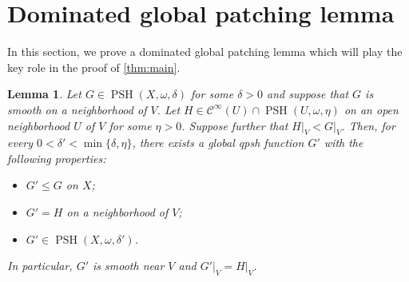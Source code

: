 \documentclass[12pt,reqno]{amsart}
\newtheorem{lem}{Lemma}[section]
\newtheorem{rem}{Remark}[section]
\newcommand{\PSH}{\operatorname{PSH}}
\newcommand{\restr}[2]{\left.#1\right|_{#2}}
\begin{document}
	
	\section{Dominated global patching lemma}
	
	In this section, we prove a dominated global patching lemma which will play the key role in the proof of \cref{thm:main}.
	
	\begin{lem}\label{lem:insertion}
		Let $G\in\PSH(X,\omega,\delta)$ for some $\delta>0$ and suppose that $G$ is smooth on a neighborhood of $V$. Let $H\in \mathcal C^\infty(U)\cap\PSH(U,\omega,\eta)$ on an open neighborhood $U$ of $V$ for some $\eta>0$. Suppose further that  $\restr{H}{V}<\restr{G}{V}$.
		Then, for every $0<\delta'<\min\{\delta,\eta\}$,
		there exists a global qpsh function $G'$ with the following properties:
		\begin{itemize}
			\item  $G'\leq G$ on $X$;
			\item $G'=H$ on a neighborhood of $V$;
			\item $G'\in \PSH(X,\omega,\delta')$.
		\end{itemize}
		In particular, $G'$ is smooth near $V$ and $\restr{G'}{V}=\restr{H}{V}$.
	\end{lem}
	
\end{document}
